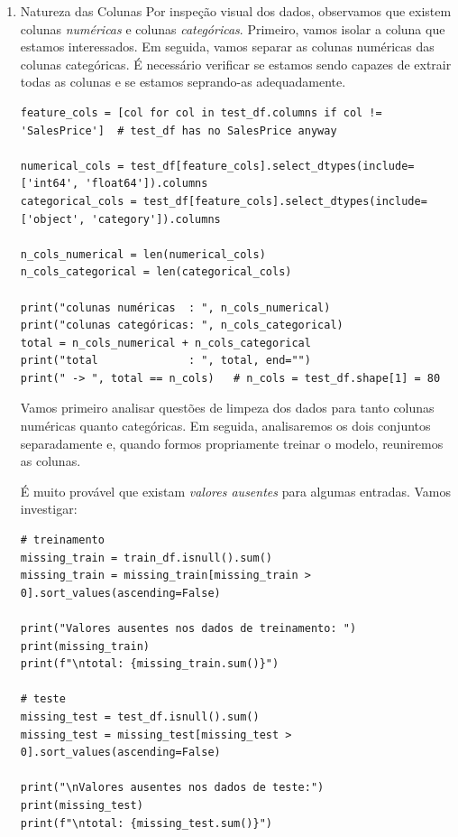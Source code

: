 \documentclass[11pt]{article}
\begin{document}
\begin{enumerate}
\item Natureza das Colunas
\label{sec:org6a8d5bb}
Por inspeção visual dos dados, observamos que existem colunas \emph{numéricas} e colunas \emph{categóricas}. Primeiro, vamos isolar a coluna que estamos interessados. Em seguida, vamos separar as colunas numéricas das colunas categóricas. É necessário verificar se estamos sendo capazes de extrair todas as colunas e se estamos seprando-as adequadamente.

\begin{verbatim}
feature_cols = [col for col in test_df.columns if col != 'SalesPrice']  # test_df has no SalesPrice anyway

numerical_cols = test_df[feature_cols].select_dtypes(include=['int64', 'float64']).columns
categorical_cols = test_df[feature_cols].select_dtypes(include=['object', 'category']).columns

n_cols_numerical = len(numerical_cols)
n_cols_categorical = len(categorical_cols)

print("colunas numéricas  : ", n_cols_numerical)
print("colunas categóricas: ", n_cols_categorical)
total = n_cols_numerical + n_cols_categorical
print("total              : ", total, end="")
print(" -> ", total == n_cols)   # n_cols = test_df.shape[1] = 80
\end{verbatim}

Vamos primeiro analisar questões de limpeza dos dados para tanto colunas numéricas quanto categóricas. Em seguida, analisaremos os dois conjuntos separadamente e, quando formos propriamente treinar o modelo, reuniremos as colunas.

É muito provável que existam \emph{valores ausentes} para algumas entradas. Vamos investigar:

\begin{verbatim}
# treinamento
missing_train = train_df.isnull().sum()
missing_train = missing_train[missing_train > 0].sort_values(ascending=False)

print("Valores ausentes nos dados de treinamento: ")
print(missing_train)
print(f"\ntotal: {missing_train.sum()}")

# teste
missing_test = test_df.isnull().sum()
missing_test = missing_test[missing_test > 0].sort_values(ascending=False)

print("\nValores ausentes nos dados de teste:")
print(missing_test)
print(f"\ntotal: {missing_test.sum()}")
\end{verbatim}


\end{enumerate}
\end{document}
